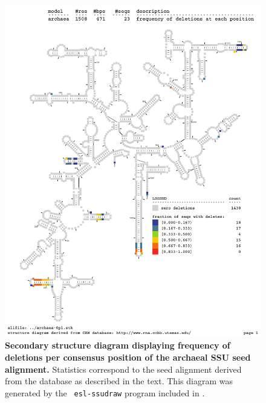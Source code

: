 \begin{figure}
\begin{center}
\includegraphics[width=5.5in]{../../seeds/ss-diagrams/archaea-0p1-dall}
\end{center}
\caption[Secondary structure diagram displaying frequency of deletions
  per consensus position of the archaeal SSU seed
  alignment]{\textbf{Secondary structure diagram displaying frequency 
  of deletions per consensus position of the archaeal SSU seed
  alignment.} Statistics correspond to the  seed
  alignment derived from the  database \cite{CannoneGutell02}
  as described in the text. This diagram was generated by the {\tt
  esl-ssudraw} program included in .}
\label{fig:arcdel}
\end{figure}


